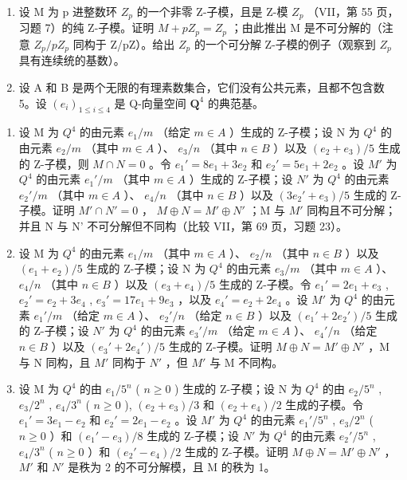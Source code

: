 \begin{enumerate}
\def\labelenumi{\arabic{enumi})}
\setcounter{enumi}{9}
\item
  设 M 为 p 进整数环 \(Z_{p}\) 的一个非零 Z-子模，且是 Z-模 \(Z_{p}\) （VII，第 55 页，习题 7）的纯 Z-子模。证明 \(M + pZ_{p} = Z_{p}\) ；由此推出 M 是不可分解的（注意 \(Z_{p}/pZ_{p}\) 同构于 Z/pZ）。给出 \(Z_{p}\) 的一个可分解 Z-子模的例子（观察到 \(Z_{p}\) 具有连续统的基数）。
\item
  设 A 和 B 是两个无限的有理素数集合，它们没有公共元素，且都不包含数 5。设 \((e_i)_{1 \leqslant i \leqslant 4}\) 是 Q-向量空间 \(\mathbf{Q}^4\) 的典范基。
\end{enumerate}

\begin{enumerate}
\def\labelenumi{\alph{enumi})}
\item
  设 M 为 \(Q^{4}\) 的由元素 \(e_{1}/m\) （给定 \(m \in A\) ）生成的 Z-子模；设 N 为 \(Q^{4}\) 的由元素 \(e_{2}/m\) （其中 \(m \in A\) ）、 \(e_{3}/n\) （其中 \(n \in B\) ）以及 \((e_{2} + e_{3})/5\) 生成的 Z-子模，则 \(M \cap N = 0\) 。令 \(e_{1}' = 8e_{1} + 3e_{2}\) 和 \(e_{2}' = 5e_{1} + 2e_{2}\) 。设 \(M'\) 为 \(Q^{4}\) 的由元素 \(e_{1}'/m\) （其中 \(m \in A\) ）生成的 Z-子模；设 \(N'\) 为 \(Q^{4}\) 的由元素 \(e_{2}'/m\) （其中 \(m \in A\) ）、 \(e_{4}/n\) （其中 \(n \in B\) ）以及 \((3e_{2}' + e_{3})/5\) 生成的 Z-子模。证明 \(M' \cap N' = 0\) ， \(M \oplus N = M' \oplus N'\) ；M 与 \(M'\) 同构且不可分解；并且 N 与 N' 不可分解但不同构（比较 VII，第 69 页，习题 23）。
\item
  设 M 为 \(Q^{4}\) 的由元素 \(e_{1}/m\) （其中 \(m \in A\) ）、 \(e_{2}/n\) （其中 \(n \in B\) ）以及 \((e_{1} + e_{2})/5\) 生成的 Z-子模；设 N 为 \(Q^{4}\) 的由元素 \(e_{3}/m\) （其中 \(m \in A\) ）、 \(e_{4}/n\) （其中 \(n \in B\) ）以及 \((e_{3} + e_{4})/5\) 生成的 Z-子模。令 \(e_{1}' = 2e_{1} + e_{3}\) , \(e_{2}' = e_{2} + 3e_{4}\) , \(e_{3}' = 17e_{1} + 9e_{3}\) ，以及 \(e_{4}' = e_{2} + 2e_{4}\) 。设 \(M'\) 为 \(Q^{4}\) 的由元素 \(e_{1}'/m\) （给定 \(m \in A\) ）、 \(e_{2}'/n\) （给定 \(n \in B\) ）以及 \((e_{1}' + 2e_{2}')/5\) 生成的 Z-子模；设 \(N'\) 为 \(Q^{4}\) 的由元素 \(e_{3}'/m\) （给定 \(m \in A\) ）、 \(e_{4}'/n\) （给定 \(n \in B\) ）以及 \((e_{3}' + 2e_{4}')/5\) 生成的 Z-子模。证明 \(M \oplus N = M' \oplus N'\) ，M 与 N 同构，且 \(M'\) 同构于 \(N'\) ，但 \(M'\) 与 M 不同构。
\item
  设 M 为 \(Q^{4}\) 的由 \(e_{1}/5^{n}\) ( \(n \geqslant 0\) ) 生成的 Z-子模；设 N 为 \(Q^{4}\) 的由 \(e_{2}/5^{n}\) , \(e_{3}/2^{n}\) , \(e_{4}/3^{n}\) ( \(n \geqslant 0\) ), \((e_{2} + e_{3})/3\) 和 \((e_{2} + e_{4})/2\) 生成的子模。令 \(e_{1}' = 3e_{1} - e_{2}\) 和 \(e_{2}' = 2e_{1} - e_{2}\) 。设 \(M'\) 为 \(Q^{4}\) 的由元素 \(e_{1}'/5^{n}\) , \(e_{3}/2^{n}\) ( \(n \geqslant 0\) ）和 \((e_{1}' - e_{3})/8\) 生成的 Z-子模；设 \(N'\) 为 \(Q^{4}\) 的由元素 \(e_{2}'/5^{n}\) , \(e_{4}/3^{n}\) ( \(n \geqslant 0\) ）和 \((e_{2}' - e_{4})/2\) 生成的 Z-子模。证明 \(M \oplus N = M' \oplus N'\) ， \(M'\) 和 \(N'\) 是秩为 2 的不可分解模，且 M 的秩为 1。
\end{enumerate}
\relax{}

